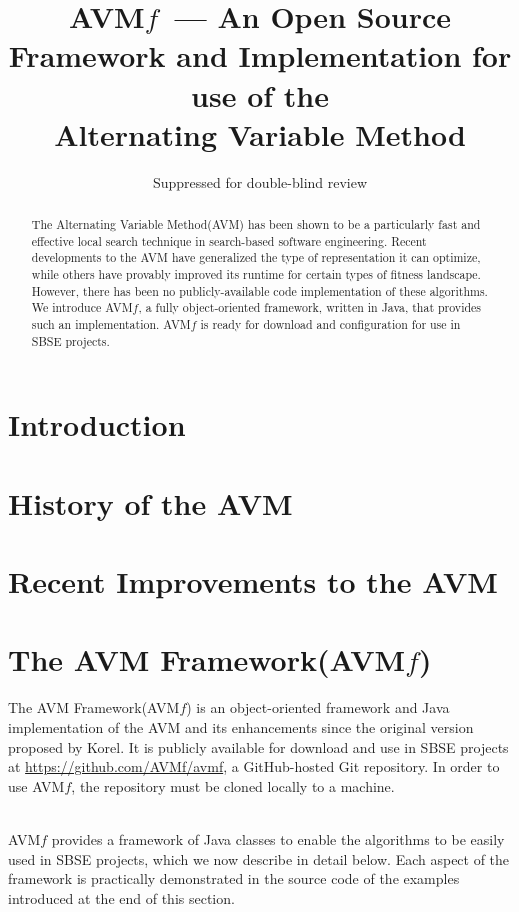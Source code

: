 \documentclass{llncs}
\newcommand{\AVM}{Alternating Variable Method\xspace}
\newcommand{\longname}{AVM Framework\xspace}
\newcommand{\name}{AVM\hspace{-1pt}$f$\xspace}
\newcommand{\repourl}{\url{https://github.com/AVMf/avmf}\xspace}
\begin{document}
\title{\name ~--- An Open Source Framework and Implementation for use of the \\ \AVM}
\author{Suppressed for double-blind review}

\maketitle

\begin{abstract}
The \AVM (AVM) has been shown to be a particularly fast and effective local search technique in search-based software engineering. %
%
Recent developments to the AVM have generalized the type of representation it can optimize, while others have provably improved its runtime for certain types of fitness landscape. However, there has been no publicly-available code implementation of these algorithms. We introduce \name, a  fully object-oriented framework, written in Java, that provides such an implementation. \name is ready for download and configuration for use in SBSE projects.

\end{abstract}

\section{Introduction}

\section{History of the AVM}

\section{Recent Improvements to the AVM}

\section{The \longname (\name)}
The \longname (\name) is an object-oriented framework and Java implementation of the AVM and its enhancements since the original version proposed by Korel. It is publicly available for download and use in SBSE projects at \repourl, a GitHub-hosted Git repository. In order to use \name, the repository must be cloned locally to a machine.

~\\
\name provides a framework of Java classes to enable the algorithms to be easily used in SBSE projects, which we now describe in detail below. Each aspect of the framework is practically demonstrated in the source code of the examples introduced at the end of this section.
\end{document}
